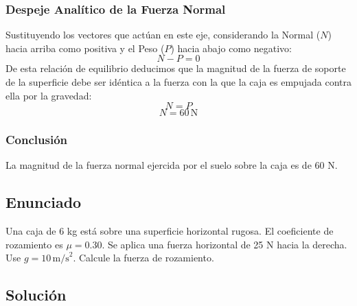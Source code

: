 \documentclass[12pt]{article}
\begin{document}
\subsubsection*{Despeje Analítico de la Fuerza Normal}
Sustituyendo los vectores que actúan en este eje, considerando la Normal ($N$) hacia arriba como positiva y el Peso ($P$) hacia abajo como negativo:
\begin{equation}
    N - P = 0
\end{equation}
De esta relación de equilibrio deducimos que la magnitud de la fuerza de soporte de la superficie debe ser idéntica a la fuerza con la que la caja es empujada contra ella por la gravedad:
\begin{equation}
    N = P
\end{equation}
\begin{equation}
    N = 60 \, \text{N}
\end{equation}

\subsubsection*{Conclusión}
La magnitud de la fuerza normal ejercida por el suelo sobre la caja es de 60 N.

\newpage

\subsection*{Enunciado}
Una caja de 6 kg está sobre una superficie horizontal rugosa. El coeficiente de rozamiento es $\mu = 0.30$. Se aplica una fuerza horizontal de 25 N hacia la derecha. Use $g = 10 \, \text{m/s}^2$. Calcule la fuerza de rozamiento.

\begin{center}
\end{center}

\subsection*{Solución}
\end{document}
